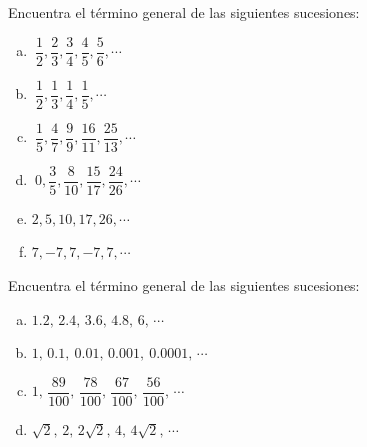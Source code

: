 \begin{mipropuesto}

Encuentra el término general de las siguientes sucesiones:

\begin{multicols}{3}
\begin{enumerate}[a) ]
\item $\ \dfrac{1}{2},\dfrac{2}{3},\dfrac{3}{4},\dfrac{4}{5},\dfrac{5}{6},\cdots$
\item $\ \dfrac{1}{2},\dfrac{1}{3},\dfrac{1}{4},\dfrac{1}{5},\cdots$
\item $\ \dfrac{1}{5},\dfrac{4}{7},\dfrac{9}{9},\dfrac{16}{11},\dfrac{25}{13},\cdots$
\item $\ 0,\dfrac{3}{5},\dfrac{8}{10},\dfrac{15}{17},\dfrac{24}{26},\cdots$
\item $2,5,10,17,26,\cdots$
\item $7,-7,7,-7,7,\cdots$

\end{enumerate}
	
\end{multicols}

\end{mipropuesto}

\vspace{-8mm}
\begin{flushright}
	\begin{footnotesize} \textcolor{gris}{}	\end{footnotesize}
	
	\begin{footnotesize} \textcolor{gris}{}	\end{footnotesize}
\end{flushright}







\begin{mipropuesto}

Encuentra el término general de las siguientes sucesiones:
\begin{multicols}{2}
\begin{enumerate}[a) ]
\item $1.2,\, 2.4,\, 3.6,\, 4.8,\, 6,\, \cdots$
\item $1,\, 0.1,\ 0.01,\, 0.001,\ 0.0001,\, \cdots$
\item $1, \, \dfrac{89}{100}, \, \dfrac{78}{100}, \, \dfrac{67}{100}, \, \dfrac{56}{100},\, \cdots$
\item $\sqrt{2}, \, 2,\, 2\sqrt{2},\, 4,\, 4\sqrt{2},\, \cdots$
\end{enumerate}
	
\end{multicols}

\end{mipropuesto}


